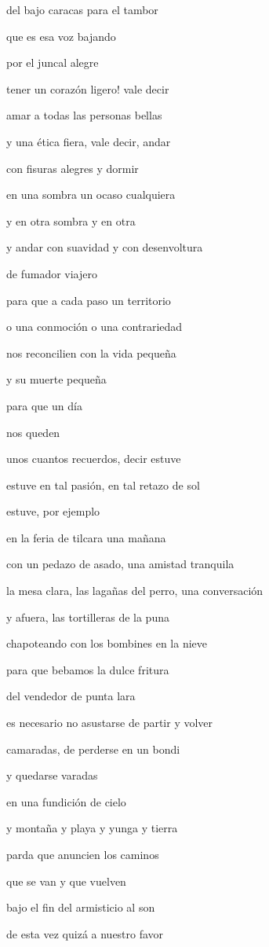 \documentclass[
]{book}
\begin{document}
del bajo caracas para el tambor

que es esa voz bajando

por el juncal alegre

tener un corazón ligero! vale decir

amar a todas las personas bellas

y una ética fiera, vale decir, andar

con fisuras alegres y dormir

en una sombra un ocaso cualquiera

y en otra sombra y en otra

y andar con suavidad y con desenvoltura

de fumador viajero

para que a cada paso un territorio

o una conmoción o una contrariedad

nos reconcilien con la vida pequeña

y su muerte pequeña

para que un día

nos queden

unos cuantos recuerdos, decir estuve

estuve en tal pasión, en tal retazo de sol

estuve, por ejemplo

en la feria de tilcara una mañana

con un pedazo de asado, una amistad tranquila

la mesa clara, las lagañas del perro, una conversación

y afuera, las tortilleras de la puna

chapoteando con los bombines en la nieve

para que bebamos la dulce fritura

del vendedor de punta lara

es necesario no asustarse de partir y volver

camaradas, de perderse en un bondi

y quedarse varadas

en una fundición de cielo

y montaña y playa y yunga y tierra

parda que anuncien los caminos

que se van y que vuelven

bajo el fin del armisticio al son

de esta vez quizá a nuestro favor
\end{document}
